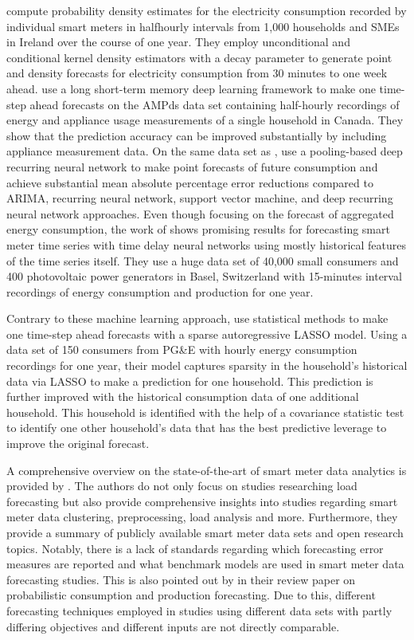 \citet{Arora:2016} compute probability density estimates for the electricity consumption recorded by individual smart meters in halfhourly intervals from 1,000 households and SMEs in Ireland over the course of one year. They employ unconditional and conditional kernel density estimators with a decay parameter to generate point and density forecasts for electricity consumption from 30 minutes to one week ahead. \citet{Kong:2018} use a long short-term memory deep learning framework to make one time-step ahead forecasts on the AMPds data set containing half-hourly recordings of energy and appliance usage measurements of a single household in Canada. They show that the prediction accuracy can be improved substantially by including appliance measurement data. On the same data set as \citet{Arora:2016}, \citet{Shi:2017} use a pooling-based deep recurring neural network to make point forecasts of future consumption and achieve substantial mean absolute percentage error reductions compared to ARIMA, recurring neural network, support vector machine, and deep recurring neural network approaches. Even though focusing on the forecast of aggregated energy consumption, the work of \citet{Zufferey:2017} shows promising results for forecasting smart meter time series with time delay neural networks using mostly historical features of the time series itself. They use a huge data set of 40,000 small consumers and 400 photovoltaic power generators in Basel, Switzerland with 15-minutes interval recordings of energy consumption and production for one year.

Contrary to these machine learning approach, \citet{Li:2017} use statistical methods to make one time-step ahead forecasts with a sparse autoregressive LASSO model. Using a data set of 150 consumers from PG\&E with hourly energy consumption recordings for one year, their model captures sparsity in the household’s historical data via LASSO to make a prediction for one household. This prediction is further improved with the historical consumption data of one additional household. This household is identified with the help of a covariance statistic test to identify one other household's data that has the best predictive leverage to improve the original forecast.

A comprehensive overview on the state-of-the-art of smart meter data analytics is provided by \citet{Wang:2018}. The authors do not only focus on studies researching load forecasting but also provide comprehensive insights into studies regarding smart meter data clustering, preprocessing, load analysis and more. Furthermore, they provide a summary of publicly available smart meter data sets and open research topics. Notably, there is a lack of standards regarding which forecasting error measures are reported and what benchmark models are used in smart meter data forecasting studies. This is also pointed out by \citet{Meer:2018} in their review paper on probabilistic consumption and production forecasting. Due to this, different forecasting techniques employed in studies using different data sets with partly differing objectives and different inputs are not directly comparable. 



